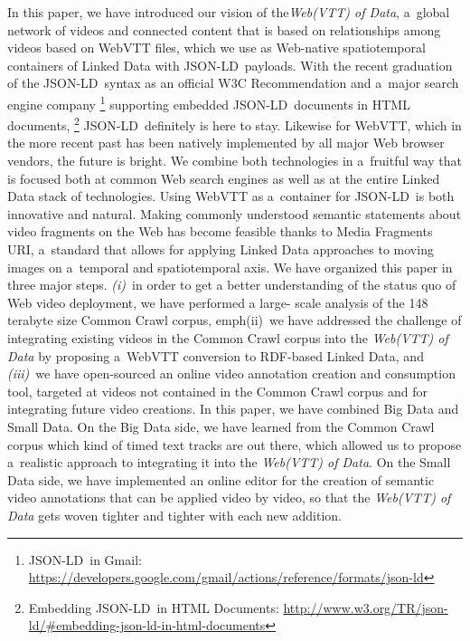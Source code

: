 \documentclass{sig-alternate}
\newcommand{\inlinelistingsize}{\fontsize{8pt}{11pt}}
\let\oldurl\url
\renewcommand{\url}[1]{\inlinelistingsize\oldurl{#1}}
\def\JSONLD{\mbox{JSON-LD}}
\begin{document}
In this paper, we have introduced our vision of the\linebreak \emph{Web(VTT) of Data},
a~global network of videos and connected content
that is based on relationships among videos based on WebVTT files,
which we use as Web-native spatiotemporal containers of Linked Data
with \JSONLD\ payloads.
With the recent graduation of the \JSONLD\ syntax
as an official W3C Recommendation and a~major search engine company%
\footnote{\JSONLD\ in Gmail:
\url{https://developers.google.com/gmail/actions/reference/formats/json-ld}}
supporting embedded \JSONLD\ documents in HTML documents,%
\footnote{Embedding \JSONLD\ in HTML Documents:
\url{http://www.w3.org/TR/json-ld/\#embedding-json-ld-in-html-documents}}
\JSONLD\ definitely is here to stay.
Likewise for WebVTT, which in the more recent past has been natively implemented
by all major Web browser vendors,
the future is bright.
We combine both technologies in a~fruitful way that is focused
both at common Web search engines
as well as at the entire Linked Data stack of technologies.
Using WebVTT as a~container for \JSONLD\ is both innovative and natural.
Making commonly understood semantic statements about video fragments on the Web
has become feasible thanks to Media Fragments URI,
a~standard that allows for applying Linked Data approaches to moving images
on a~temporal and spatiotemporal axis.
We have organized this paper in three major steps.
\emph{(i)}~in order to get a better understanding of the status quo
of Web video deployment, we have performed a large- scale analysis
of the 148 terabyte size Common Crawl corpus,
emph{(ii)}~we have addressed the challenge of integrating
existing videos in the Common Crawl corpus into the \emph{Web(VTT) of Data}
by proposing a~WebVTT conversion to RDF-based Linked Data,
and \emph{(iii)}~we have open-sourced an online video annotation creation
and consumption tool, targeted at videos not contained in the Common Crawl corpus
and for integrating future video creations.
In this paper, we have combined Big Data and Small Data.
On the Big Data side, we have learned from the Common Crawl corpus
which kind of timed text tracks are out there,
which allowed us to propose a~realistic approach to integrating it
into the \emph{Web(VTT) of Data}.
On the Small Data side, we have implemented an online editor for the creation
of semantic video annotations that can be applied video by video,
so that the \emph{Web(VTT) of Data} gets woven tighter and tighter with each new addition.
\end{document}
